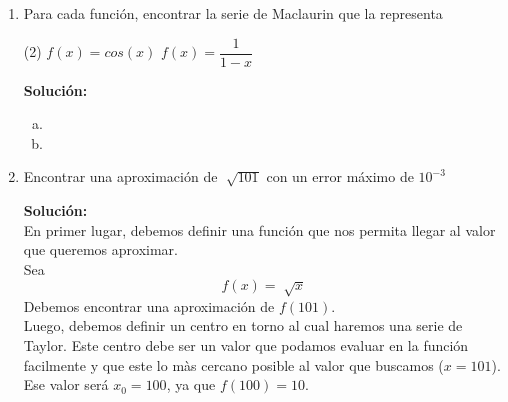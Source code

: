 \documentclass[12pt]{article}
\newenvironment{solucion}
{\begin{mdframed}[backgroundcolor=black!10]
		{\bf Solución:}\\
	}
	{
	\end{mdframed}
}
\newenvironment{preguntas}
{\begin{enumerate}\itemsep12pt
	}
	{
	\end{enumerate}
}
\begin{document}
\begin{preguntas}
\begin{solucion}
Integramos,
$$\int f(x)dx 
= \sum\limits_{n=2}^{\infty}\dfrac{\cancel{n}(n+1)}{3^{n-1}} \dfrac{x^n}{\cancel{n}} 
= \sum\limits_{n=2}^{\infty}\dfrac{n+1}{3^{n-1}} x^n$$
Integramos  nuevamente,
$$\iint f(x)dxdx 
= \sum\limits_{n=2}^{\infty}\dfrac{\cancel{n+1}}{3^{n-1}} \dfrac{x^{n+1}}{\cancel{n+1}} 
= \sum\limits_{n=2}^{\infty}\dfrac{x^{n+1}}{3^{n-1}}$$
Notemos que
$$\sum\limits_{n=2}^{\infty}\dfrac{x^{n+1}}{3^{n-1}}
= \sum\limits_{n=0}^{\infty}\dfrac{x^{n+3}}{3^{n+1}}
= \dfrac{x^3}{3}\sum\limits_{n=0}^{\infty}\left(\dfrac{x}{3}\right)^n
= \dfrac{x^3}{3}\dfrac{1}{1-\dfrac{x}{3}}
= \dfrac{x^3}{3-x}$$
Por lo que
$$\iint f(x)dxdx 
= \dfrac{x^3}{3-x}$$
Derivamos,
$$\int f(x)dx
= \left(\dfrac{x^3}{3-x}\right)' 
= \dfrac{9x^2-2x^3}{(3-x)^2}
$$
Derivamos nuevamente,
$$f(x)
= \left(\dfrac{9x^2-2x^3}{(3-x)^2}\right)' 
= \dfrac{(18x-6x^2)(3-x)^2 + 2(3-x)(9x^2-2x^3)}{(3-x)^4}
$$
Finalmente,
$$f(1)
= \dfrac{(18-6)(3-1)^2 + 2(3-1)(9-2)}{(3-1)^4}
=\dfrac{19}{4}
$$
Por lo que
$$ \sum\limits_{n=2}^{\infty}\dfrac{n(n+1)}{3^{n-1}} 
=\dfrac{19}{4}$$
\end{solucion}
\item Para cada función, encontrar la serie de Maclaurin que la representa
\begin{tasks}(2)
\task $f(x) = cos(x)$
\task $f(x) = \dfrac{1}{1-x}$
\end{tasks}
\begin{solucion}

\begin{enumerate}[a)]
\item 
\item 
\end{enumerate}
\end{solucion}
\item Encontrar una aproximación de $\sqrt[]{101}$ con un error máximo de $10^{-3}$
\begin{solucion}
En primer lugar, debemos definir una función que nos permita llegar al valor que queremos aproximar.\\

Sea
$$f(x) = \sqrt[]{x}$$
Debemos encontrar una aproximación de $f(101)$.\\

Luego, debemos definir un centro en torno al cual haremos una serie de Taylor. Este centro debe ser un valor que podamos evaluar en la función facilmente y que este lo màs cercano posible al valor que buscamos ($x = 101$). \\

Ese valor será $x_0=100$, ya que $f(100) = 10$.\\


\end{solucion}
\end{preguntas}
\end{document}
